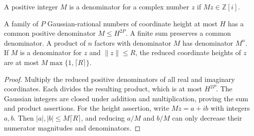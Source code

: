 \begin{definition}
    \label{def:lvv_gaussian_integer_denominator}
    \leanok
    A positive integer $M$ is a denominator for a complex number $z$ if
    $Mz\in\mathbb Z[i]$.
\end{definition}

\begin{lemma}
    \label{lem:lvv_common_rational_denominator}
    \leanok
    A family of $P$ Gaussian-rational numbers of coordinate height at most
    $H$ has a common positive denominator $M\le H^{2P}$.
    A finite sum preserves a common denominator. A product of $n$ factors
    with denominator $M$ has denominator $M^n$.
    If $M$ is a denominator for $z$ and $\|z\|\le R$, the reduced
    coordinate heights of $z$ are at most
    $M\max\{1,\lceil R\rceil\}$.
\end{lemma}
\begin{proof}\leanok
    Multiply the reduced positive denominators of all real and imaginary
    coordinates. Each divides the resulting product, which is at most
    $H^{2P}$. The Gaussian integers are closed under addition and
    multiplication, proving the sum and product assertions.
    For the height assertion, write $Mz=a+ib$ with integers $a,b$.
    Then $|a|,|b|\le M\lceil R\rceil$, and reducing $a/M$ and $b/M$
    can only decrease their numerator magnitudes and denominators.
\end{proof}

